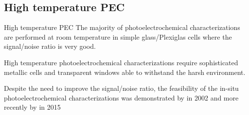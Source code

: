 \documentclass[10pt,compress,handout]{beamer}
\begin{document}
\subsection{High temperature PEC}
    \begin{frame}[allowframebreaks=1.0]{High temperature PEC}
        The majority of photoelectrochemical characterizations are performed at 
        room temperature in simple glass/Plexiglas cells where the signal/noise 
        ratio is very good.
        
        High temperature photoelectrochemical characterizations 
        require sophisticated metallic cells and transparent windows 
        able to withstand the harsh environment. 
        
        Despite the need to improve the signal/noise ratio, the feasibility of 
        the in-situ photoelectrochemical characterizations was demonstrated by 
        \citet{bojinov2002} in 2002 and more recently by \citet{skocic2016} in 2015 


\end{frame}
\end{document}
